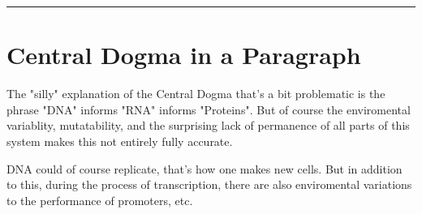 \documentclass[letterpaper]{article}
\begin{document}
\noindent\rule{\textwidth}{0.5pt}

\section{Central Dogma in a Paragraph}
\label{sec:org396ef48}
The "silly" explanation of the Central Dogma that's a bit problematic is
the phrase "DNA" informs "RNA" informs "Proteins". But of course the
enviromental variablity, mutatability, and the surprising lack of
permanence of all parts of this system makes this not entirely fully
accurate.

DNA could of course replicate, that's how one makes new cells. But in
addition to this, during the process of transcription, there are also
enviromental variations to the performance of promoters, etc.
\end{document}
